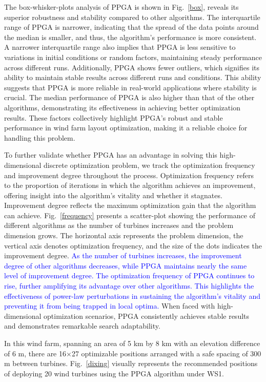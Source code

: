 \documentclass[journal,twoside]{IEEEtran}
\begin{document}
The box-whisker-plots analysis of PPGA is shown in Fig.~\ref{box}, reveals its superior robustness and stability compared to other algorithms. The interquartile range of PPGA is narrower, indicating that the spread of the data points around the median is smaller, and thus, the algorithm's performance is more consistent. A narrower interquartile range also implies that PPGA is less sensitive to variations in initial conditions or random factors, maintaining steady performance across different runs. Additionally, PPGA shows fewer outliers, which signifies its ability to maintain stable results across different runs and conditions. This ability suggests that PPGA is more reliable in real-world applications where stability is crucial. The median performance of PPGA is also higher than that of the other algorithms, demonstrating its effectiveness in achieving better optimization results. These factors collectively highlight PPGA's robust and stable performance in wind farm layout optimization, making it a reliable choice for handling this problem.

To further validate whether PPGA has an advantage in solving this high-dimensional discrete optimization problem, we track the optimization frequency and improvement degree throughout the process. Optimization frequency refers to the proportion of iterations in which the algorithm achieves an improvement, offering insight into the algorithm's vitality and whether it stagnates. Improvement degree reflects the maximum optimization gain that the algorithm can achieve. Fig.~\ref{frequency} presents a scatter-plot showing the performance of different algorithms as the number of turbines increases and the problem dimension grows. The horizontal axis represents the problem dimension, the vertical axis denotes optimization frequency, and the size of the dots indicates the improvement degree. \textcolor{blue}{As the number of turbines increases, the improvement degree of other algorithms decreases, while PPGA maintains nearly the same level of improvement degree. The optimization frequency of PPGA continues to rise, further amplifying its advantage over other algorithms. This highlights the effectiveness of power-law perturbations in sustaining the algorithm's vitality and preventing it from being trapped in local optima.} When faced with high-dimensional optimization scenarios, PPGA consistently achieves stable results and demonstrates remarkable search adaptability.

In this wind farm, spanning an area of 5 km by 8 km with an elevation difference of 6 m, there are 16$\times$27 optimizable positions arranged with a safe spacing of 300 m between turbines. Fig.~\ref{dixing} visually represents the recommended positions of deploying 20 wind turbines using the PPGA algorithm under WS1.
\end{document}

